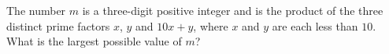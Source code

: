 The number $m$ is a three-digit positive integer and is the product of the three distinct prime factors $x$, $y$ and $10x+y$, where $x$ and $y$ are each less than $10$. What is the largest possible value of $m$?
